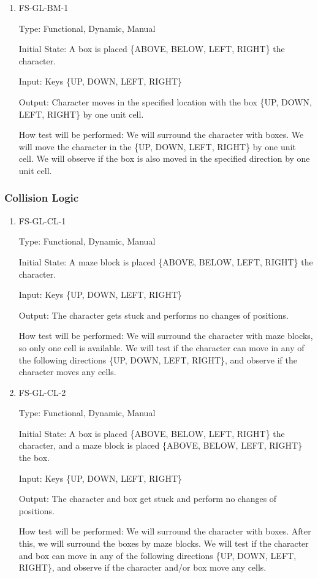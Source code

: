\documentclass[12pt, titlepage]{article}
\begin{document}
\begin{enumerate}

\item{FS-GL-BM-1\\}

Type: Functional, Dynamic, Manual
					
Initial State: A box is placed \{ABOVE, BELOW, LEFT, RIGHT\} the character.
					
Input: Keys \{UP, DOWN, LEFT, RIGHT\}
					
Output: Character moves in the specified location with the box \{UP, DOWN, LEFT, RIGHT\} by one unit cell.
					
How test will be performed: We will surround the character with boxes. We will move the character in the \{UP, DOWN, LEFT, RIGHT\} by one unit cell. We will observe if the box is also moved in the specified direction by one unit cell.

\end{enumerate}

\subsubsection{Collision Logic}

\begin{enumerate}

\item{FS-GL-CL-1\\}

Type: Functional, Dynamic, Manual
					
Initial State: A maze block is placed \{ABOVE, BELOW, LEFT, RIGHT\} the character.
					
Input: Keys \{UP, DOWN, LEFT, RIGHT\}
					
Output: The character gets stuck and performs no changes of positions. 
					
How test will be performed: We will surround the character with maze blocks, so only one cell is available. We will test if the character can move in any of the following directions \{UP, DOWN, LEFT, RIGHT\}, and observe if the character moves any cells.

\item{FS-GL-CL-2\\}

Type: Functional, Dynamic, Manual
					
Initial State: A box is placed \{ABOVE, BELOW, LEFT, RIGHT\} the character, and a maze block is placed \{ABOVE, BELOW, LEFT, RIGHT\} the box.
					
Input: Keys \{UP, DOWN, LEFT, RIGHT\}
					
Output: The character and box get stuck and perform no changes of positions. 
					
How test will be performed: We will surround the character with boxes. After this, we will surround the boxes by maze blocks. We will test if the character and box can move in any of the following directions \{UP, DOWN, LEFT, RIGHT\}, and observe if the character and/or box move any cells.

\end{enumerate}
				
\end{document}
